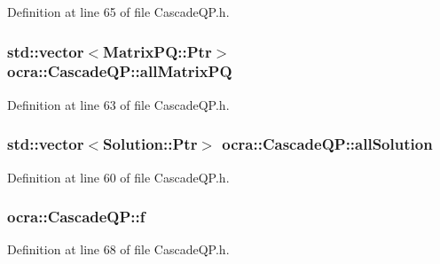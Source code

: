 Definition at line 65 of file Cascade\+Q\+P.\+h.

\subsubsection[{\texorpdfstring{all\+Matrix\+PQ}{allMatrixPQ}}]{\setlength{\rightskip}{0pt plus 5cm}std\+::vector$<$Matrix\+P\+Q\+::\+Ptr$>$ ocra\+::\+Cascade\+Q\+P\+::all\+Matrix\+PQ\hspace{0.3cm}{\ttfamily [protected]}}\hypertarget{classocra_1_1CascadeQP_a9f444092058e2d94da26af59aca9b312}{}\label{classocra_1_1CascadeQP_a9f444092058e2d94da26af59aca9b312}


Definition at line 63 of file Cascade\+Q\+P.\+h.

\subsubsection[{\texorpdfstring{all\+Solution}{allSolution}}]{\setlength{\rightskip}{0pt plus 5cm}std\+::vector$<$Solution\+::\+Ptr$>$ ocra\+::\+Cascade\+Q\+P\+::all\+Solution\hspace{0.3cm}{\ttfamily [protected]}}\hypertarget{classocra_1_1CascadeQP_ae8883fb4a62f072b2216304955e3e0b2}{}\label{classocra_1_1CascadeQP_ae8883fb4a62f072b2216304955e3e0b2}


Definition at line 60 of file Cascade\+Q\+P.\+h.

\subsubsection[{\texorpdfstring{f}{f}}]{ ocra\+::\+Cascade\+Q\+P\+::f\hspace{0.3cm}{\ttfamily [protected]}}\hypertarget{classocra_1_1CascadeQP_a0363a53bef69ce85777c3a2ce1c4c251}{}\label{classocra_1_1CascadeQP_a0363a53bef69ce85777c3a2ce1c4c251}


Definition at line 68 of file Cascade\+Q\+P.\+h.


